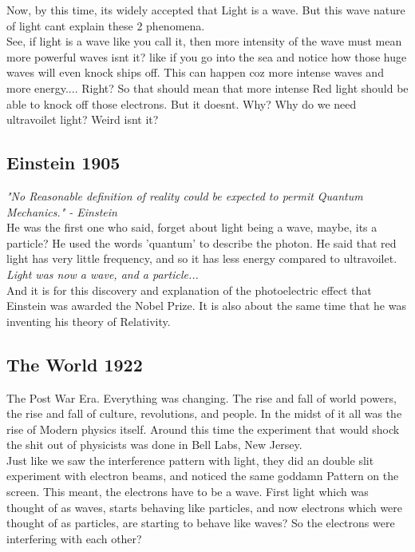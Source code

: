 \documentclass[11pt]{article}
\begin{document}
Now, by this time, its widely accepted that Light is a wave. But this wave nature of light cant explain these 2 phenomena. \\

See, if light is a wave like you call it, then more intensity of the wave must mean more powerful waves isnt it? like if you go into the sea and notice how those huge waves will even knock ships off. This can happen coz more intense waves and more energy.... Right? So that should mean that more intense Red light should be able to knock off those electrons. But it doesnt. Why? Why do we need ultravoilet light? Weird isnt it? 

\subsection{Einstein 1905}

\textit{"No Reasonable definition of reality could be expected to permit Quantum Mechanics." - Einstein}\\

He was the first one who said, forget about light being a wave, maybe, its a particle? He used the words 'quantum' to describe the photon. He said that red light has very little frequency, and so it has less energy compared to ultravoilet. \\

\textit{Light was now a wave, and a particle...}\\

And it is for this discovery and explanation of the photoelectric effect that Einstein was awarded the Nobel Prize. It is also about the same time that he was inventing his theory of Relativity.\\

\subsection{The World 1922}

The Post War Era. Everything was changing. The rise and fall of world powers, the rise and fall of culture, revolutions, and people. In the midst of it all was the rise of Modern physics itself. Around this time the experiment that would shock the shit out of physicists was done in Bell Labs, New Jersey.\\

Just like we saw the interference pattern with light, they did an double slit experiment with electron beams, and noticed the same goddamn Pattern on the screen. This meant, the electrons have to be a wave. First light which was thought of as waves, starts behaving like particles, and now electrons which were thought of as particles, are starting to behave like waves? So the electrons were interfering with each other? \\
\end{document}
